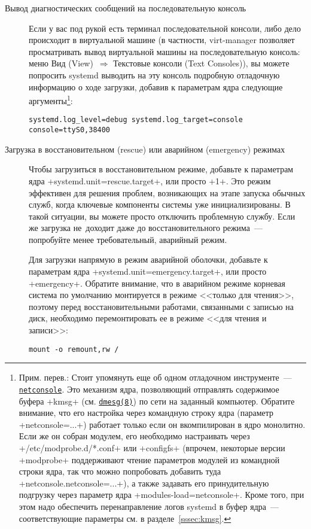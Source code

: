 \documentclass[10pt,oneside,a4paper]{article}
\newcommand{\hreftt}[2]{\href{#1}{\texttt{#2}}}
\begin{document}
\begin{description}
\item[Вывод диагностических сообщений на последовательную консоль]%
	\hypertarget{it:serial}{} Если у вас под рукой есть терминал
	последовательной консоли, либо дело происходит в виртуальной машине (в
	частности, virt-manager позволяет просматривать вывод виртуальной машины
	на последовательную консоль: меню Вид (View)~$\Rightarrow$ Текстовые
	консоли (Text Consoles)), вы можете попросить systemd выводить на эту
	консоль подробную отладочную информацию о ходе загрузки, добавив к
	параметрам ядра следующие аргументы\footnote{\label{ftn:netconsole}
	Прим. перев.: Стоит упомянуть еще об одном отладочном инструменте~---
	\hreftt{https://www.kernel.org/doc/Documentation/networking/netconsole.txt}%
	{netconsole}. Это механизм ядра, позволяющий отправлять содержимое
	буфера +kmsg+ (см.
	\hreftt{http://linux.die.net/man/8/dmesg}{dmesg(8)}) по сети на заданный
	компьютер. Обратите внимание, что его настройка через командную строку
	ядра (параметр +netconsole=...+) работает только если он вкомпилирован в
	ядро монолитно. Если же он собран модулем, его необходимо настраивать
	через +/etc/modprobe.d/*.conf+ или +configfs+ (впрочем, некоторые версии
	+modprobe+ поддерживают чтение параметров модулей из командной строки
	ядра, так что можно попробовать добавить туда
	+netconsole.netconsole=...+), а также задавать его принудительную
	подгрузку через параметр ядра +modules-load=netconsole+. Кроме того, при
	этом надо обеспечить перенаправление логов systemd в буфер ядра~---
	соответствующие параметры см. в разделе~\ref{sssec:kmsg}.}:
\begin{Verbatim}
systemd.log_level=debug systemd.log_target=console console=ttyS0,38400
\end{Verbatim}

\item[Загрузка в восстановительном (rescue) или аварийном (emergency)
	режимах] Чтобы загрузиться в восстановительном режиме, добавьте к
	параметрам ядра +systemd.unit=rescue.target+, или просто +1+. Это режим
	эффективен для решения проблем, возникающих на этапе запуска обычных
	служб, когда ключевые компоненты системы уже инициализированы. В такой
	ситуации, вы можете просто отключить проблемную службу. Если же загрузка
	не~доходит даже до восстановительного режима~--- попробуйте менее
	требовательный, аварийный режим.

	Для загрузки напрямую в режим аварийной оболочки, добавьте к параметрам
	ядра +systemd.unit=emergency.target+, или просто +emergency+. Обратите
	внимание, что в аварийном режиме корневая система по умолчанию
	монтируется в режиме <<только для чтения>>, поэтому перед
	восстановительными работами, связанными с записью на диск, необходимо
	перемонтировать ее в режиме <<для чтения и записи>>:
\begin{Verbatim}
mount -o remount,rw /
\end{Verbatim}


\end{description}
\end{document}
